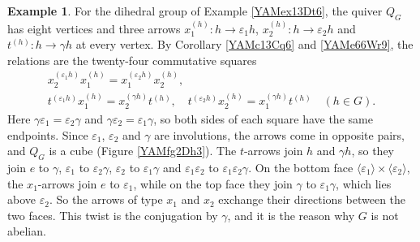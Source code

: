 \documentclass[reqno]{amsart}
\numberwithin{equation}{section}
\theoremstyle{definition}
\newtheorem{example}[equation]{Example}
\theoremstyle{remark}
\theoremstyle{plain}
\begin{document}
\begin{example}\label{YAMex19Qd7}
For the dihedral group of Example \ref{YAMex13Dt6}, the quiver $Q_G$ has eight vertices and three arrows $x_1^{(h)}\colon h\to\varepsilon_1h$, $x_2^{(h)}\colon h\to\varepsilon_2h$ and $t^{(h)}\colon h\to\gamma h$ at every vertex. By Corollary \ref{YAMc13Cq6} and \eqref{YAMe66Wr9}, the relations are the twenty-four commutative squares
\begin{gather*}
x_2^{(\varepsilon_1h)}x_1^{(h)}=x_1^{(\varepsilon_2h)}x_2^{(h)},\\
t^{(\varepsilon_1h)}x_1^{(h)}=x_2^{(\gamma h)}t^{(h)},\quad t^{(\varepsilon_2h)}x_2^{(h)}=x_1^{(\gamma h)}t^{(h)}\quad(h\in G).
\end{gather*}
Here $\gamma\varepsilon_1=\varepsilon_2\gamma$ and $\gamma\varepsilon_2=\varepsilon_1\gamma$, so both sides of each square have the same endpoints. Since $\varepsilon_1$, $\varepsilon_2$ and $\gamma$ are involutions, the arrows come in opposite pairs, and $Q_G$ is a cube (Figure \ref{YAMfg2Dh3}). The $t$-arrows join $h$ and $\gamma h$, so they join $e$ to $\gamma$, $\varepsilon_1$ to $\varepsilon_2\gamma$, $\varepsilon_2$ to $\varepsilon_1\gamma$ and $\varepsilon_1\varepsilon_2$ to $\varepsilon_1\varepsilon_2\gamma$. On the bottom face $\langle\varepsilon_1\rangle\times\langle\varepsilon_2\rangle$, the $x_1$-arrows join $e$ to $\varepsilon_1$, while on the top face they join $\gamma$ to $\varepsilon_1\gamma$, which lies above $\varepsilon_2$. So the arrows of type $x_1$ and $x_2$ exchange their directions between the two faces. This twist is the conjugation by $\gamma$, and it is the reason why $G$ is not abelian.


\end{example}
\end{document}
